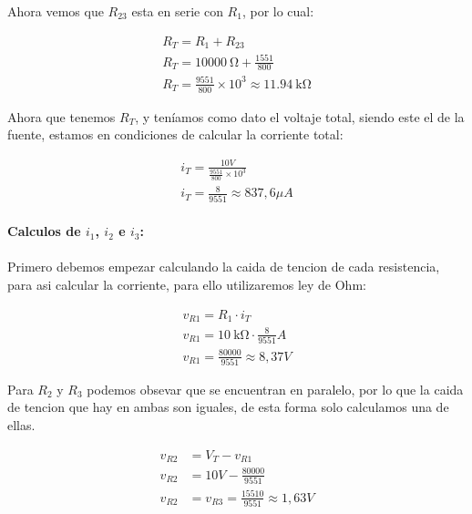 \documentclass[a4paper,12pt]{article}
\begin{document}
Ahora vemos que $R_{23}$ esta en serie con $R_1$, por lo cual:

\begin{align*}
    R_T = R_1 + R_{23} \\[0.5cm]
    R_T = \SI{10000}{\ohm} + \frac{1551}{800}  \\[0.5cm]
    R_T = \frac{9551}{800} \times10^3 \approx \SI{11.94}{\kilo\ohm}
\end{align*}

Ahora que tenemos $R_T$, y teníamos como dato el voltaje total, siendo este el de la fuente, estamos en condiciones de calcular la corriente total:

\begin{align*}
    i_T = \frac{10V}{\frac{9551}{800} \times 10^3}\\[0.5cm]
    i_T = \frac{8}{9551} \approx 837,6 \mu A 
\end{align*}

\paragraph{Calculos de $i_1$, $i_2$ e $i_3$:}
\paragraph{}
\vspace{0.5cm}

Primero debemos empezar calculando la caida de tencion de cada resistencia, para asi calcular la corriente, para ello utilizaremos ley de Ohm:

\begin{align*}
    v_{R1} = R_1 \cdot i_T \\[0.5cm]
    v_{R1} = \SI{10}{\kilo\ohm} \cdot\frac{8}{9551}A\\[0.5cm]
    v_{R1} = \frac{80000}{9551} \approx 8,37 V
\end{align*}

Para $R_2$ y $R_3$ podemos obsevar que se encuentran en paralelo, por lo que la caida de tencion que hay en ambas son iguales, de esta forma solo calculamos una de ellas.

\begin{align*}
    v_{R2} &= V_T - v_{R1}\\[0.5cm]
    v_{R2} &= 10V - \frac{80000}{9551}\\[0.5cm]
    v_{R2} &= v_{R3} = \frac{15510}{9551} \approx 1,63V 
\end{align*}

\vspace{0.5cm}
\end{document}
